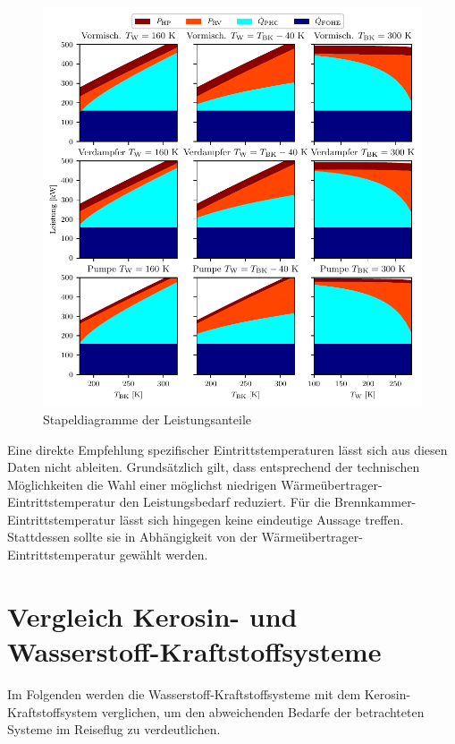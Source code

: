 \begin{figure}[ht]
\centering
\includegraphics[width=1\linewidth]{4_Abbildungen/2_Hauptteil/Ergebnisse/stackplot_summary.pdf}
  \caption{Stapeldiagramme der Leistungsanteile}
  \label{fig:stackplot}
\end{figure}
\FloatBarrier

Eine direkte Empfehlung spezifischer Eintrittstemperaturen lässt sich aus diesen Daten nicht ableiten. Grundsätzlich gilt, dass entsprechend der technischen Möglichkeiten die Wahl einer möglichst niedrigen Wärmeübertrager-Eintrittstemperatur den Leistungsbedarf reduziert. Für die Brennkammer-Eintrittstemperatur lässt sich hingegen keine eindeutige Aussage treffen. Stattdessen sollte sie in Abhängigkeit von der Wärmeübertrager-Eintrittstemperatur gewählt werden.

\section{Vergleich Kerosin- und Wasserstoff-Kraftstoffsysteme}

Im Folgenden werden die Wasserstoff-Kraftstoffsysteme mit dem Kerosin-Kraftstoffsystem verglichen, um den abweichenden Bedarfe der betrachteten Systeme im Reiseflug zu verdeutlichen. 

